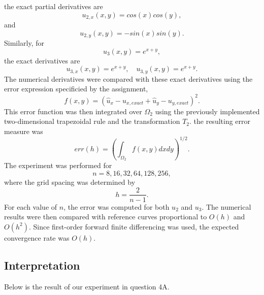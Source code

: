 \documentclass[12pt]{article}
\begin{document}
the exact partial derivatives are \begin{equation}
    u_{2,x}(x,y)=cos(x)cos(y),
\end{equation}
and \begin{equation}
    u_{2,y}(x,y) = -sin(x)sin(y).
\end{equation}
Similarly, for \begin{equation}
    u_3(x,y) = e^{x+y},
\end{equation}
the exact derivatives are \begin{equation}
    u_{3,x}(x,y)=e^{x+y}, \quad  u_{3,y}(x,y)=e^{x+y}.
\end{equation}
The numerical derivatives were compared with these exact derivatives using the error expression specificied by the assignment, \begin{equation}
    f(x,y) = (\hat{u}_x - u_{x,exact} + \hat{u}_y - u_{y,exact})^2.
\end{equation}
This error function was then integrated over $\Omega_2$ using the previously implemented two-dimensional trapezoidal rule and the transformation $T_2$. the resulting error measure was \begin{equation}
    err(h) = \left(\int_{\Omega_2}f(x,y)dxdy\right)^{1/2}.
\end{equation}
The experiment was performed for \begin{equation}
    n = 8,16,32,64,128,256,
\end{equation}
where the grid spacing was determined by \begin{equation}
    h = \frac{2}{n-1}.
\end{equation}
For each value of $n$, the error was computed for both $u_2$ and $u_3$. The numerical results were then compared with reference curves proportional to $O(h)$ and $O(h^2)$. Since first-order forward finite differencing was used, the expected convergence rate was $O(h)$. 


\subsection{Interpretation}
Below is the result of our experiment in question 4A. 
\end{document}
